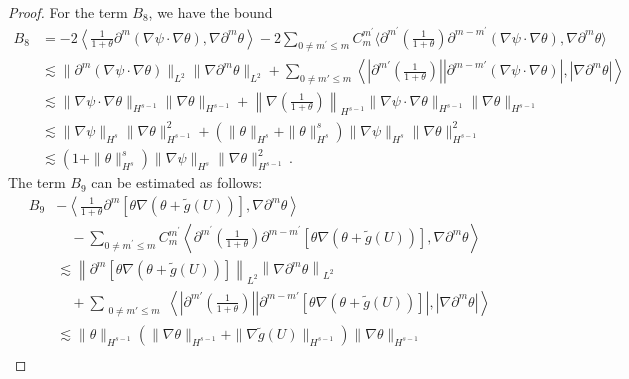 \documentclass[reqno,11pt]{amsart}
\numberwithin{equation}{section}
\def\p{\partial}
\def\no{\nonumber}
\begin{document}
\begin{proof}
For the term $B_8$, we have the bound
\begin{align}\label{theta-eq9}
\no B_8 & = -2 \left\langle \frac{1}{1+\theta} \partial^m ( \nabla \psi \cdot \nabla \theta ), \nabla \partial^m \theta \right\rangle - 2 \sum_{ 0 \neq m^\prime \leq m } C^{ m^\prime }_m \langle \p^{ m^\prime } ( \frac{1}{ 1 + \theta } ) \p^{ m - m^\prime } ( \nabla \psi \cdot \nabla \theta ), \nabla \p^m \theta \rangle \\
\no & \lesssim \| \partial^m ( \nabla \psi \cdot \nabla \theta ) \|_{L^2} \| \nabla \p^m \theta \|_{L^2} + \sum_{ 0 \neq m' \leq m } \left\langle | \partial^{m'} \left( \frac{1}{ 1 + \theta } \right) || \partial^{ m - m' } ( \nabla \psi \cdot \nabla \theta ) |, | \nabla \partial^m \theta | \right\rangle \\
\no & \lesssim \| \nabla \psi \cdot \nabla \theta \|_{ H^{s-1} } \| \nabla \theta \|_{ H^{s-1} } + \left\| \nabla \left( \frac{1}{ 1 + \theta } \right) \right\|_{ H^{s-1} } \| \nabla \psi \cdot \nabla \theta \|_{ H^{s-1} } \| \nabla \theta \|_{ H^{s-1} } \\
& \lesssim \| \nabla \psi\|_{ H^s } \| \nabla \theta \|_{ H^{s-1} }^2 + \left( \| \theta \|_{ H^s } + \| \theta \|_{ H^s }^s \right) \| \nabla \psi \|_{ H^s } \| \nabla \theta \|_{ H^{s-1} }^2 \\
\no & \lesssim ( 1 + \| \theta \|^s_{ H^s } ) \| \nabla \psi \|_{ H^s } \| \nabla \theta \|^2_{ H^{s-1} } \,.
\end{align}
The term $B_9$ can be estimated as follows:
\begin{align}\label{theta-eq10}
\no B_9 & - \left\langle \frac{1}{1+\theta} \partial^m \left[ \theta\nabla \left( \theta+\tilde{g}(U) \right) \right], \nabla \partial^m \theta \right\rangle\\
\no & \quad-\sum_{0\neq m^\prime\leq m}C^{m^\prime}_m\left\langle \p^{m^\prime}(\frac{1}{1+\theta})\p^{m-m^\prime}[\theta\nabla(\theta+\tilde{g}(U))] ,\nabla\p^m\theta \right\rangle\\
\no & \lesssim \left\| \partial^m \left[ \theta \nabla (\theta + \tilde{g}(U) )\right] \right\|_{L^2} \left\| \nabla \partial^m \theta \right\|_{L^2}\\
\no & \quad+ \sum_{\substack{0 \neq m' \leq m}} \left\langle| \partial^{m'} \left( \frac{1}{1+\theta} \right)| |\partial^{m - m'} \left[ \theta \nabla (\theta + \tilde{g}(U) )\right]|, |\nabla \partial^m \theta| \right\rangle\\
\no & \lesssim \|\theta\|_{H^{s-1}} \left( \|\nabla \theta\|_{H^{s-1}} + \|\nabla \tilde{g}(U)\|_{H^{s-1}} \right) \|\nabla \theta\|_{H^{s-1}}\\

\end{align}
\end{proof}
\end{document}
